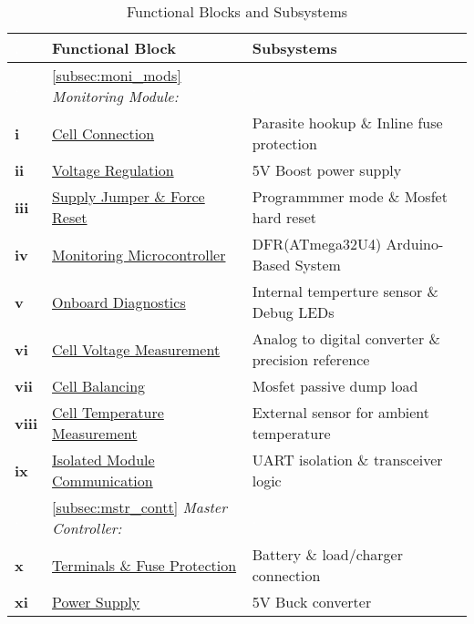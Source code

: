 \begin{table}[h]
    \centering
    \caption{Functional Blocks and Subsystems}
    \label{tab:functional_subsystems}
    \begin{tabular}{|p{0.6cm}|p{}|p{8.4cm}|}
        \hline
        \textcolor{white}{.} & \textbf{Functional Block} & \textbf{Subsystems} \\
        \hline
        \hline
        \textcolor{white}{.} & \ref{subsec:moni_mods} \emph{Monitoring Module:} & \textcolor{white}{.} \\
        \hline
        \textbf{i} & \hyperref[subsubsec:MM_terminals_dsgn]{Cell Connection} & Parasite hookup \& Inline fuse protection \\
        \hline
        \textbf{ii} & \hyperref[subsubsec:PWR_supply_dsgn]{Voltage Regulation} & 5V Boost power supply \\
        \hline
        \textbf{iii} & \hyperref[subsubsec:force_RESET]{Supply Jumper \& Force Reset} & Programmmer mode \& Mosfet hard reset \\
        \hline
        \textbf{iv} & \hyperref[subsubsec:MM_MC]{Monitoring Microcontroller} & DFR(ATmega32U4) Arduino-Based System \\
        \hline
        \textbf{v} & \hyperref[subsubsec:IntTemp_and_DB_LED]{Onboard Diagnostics} & Internal temperture sensor \& Debug LEDs \\
        \hline
        \textbf{vi} & \hyperref[subsubsec:adc_design]{Cell Voltage Measurement} & Analog to digital converter \& precision reference \\
        \hline
        \textbf{vii} & \hyperref[subsubsec:DL_Designn]{Cell Balancing} & Mosfet passive dump load  \\
        \hline
        \textbf{viii} & \hyperref[subsubsec:ExtTemp_]{Cell Temperature Measurement} & External sensor for ambient temperature \\
        \hline
        \textbf{ix} & \hyperref[subsubsec:iso_COMS]{Isolated Module Communication} & UART isolation \& transceiver logic \\
        \hline
        \textcolor{white}{.} & \ref{subsec:mstr_contt} \emph{Master Controller:} & \textcolor{white}{.} \\
        \hline
        \textbf{x} & \hyperref[subsubsec:mstr_terminals_dsgn]{Terminals \& Fuse Protection} & Battery \& load/charger connection \\
        \hline
        \textbf{xi} & \hyperref[subsubsec:mstr_Supp]{Power Supply} & 5V Buck converter \\

\end{tabular}
\end{table}
